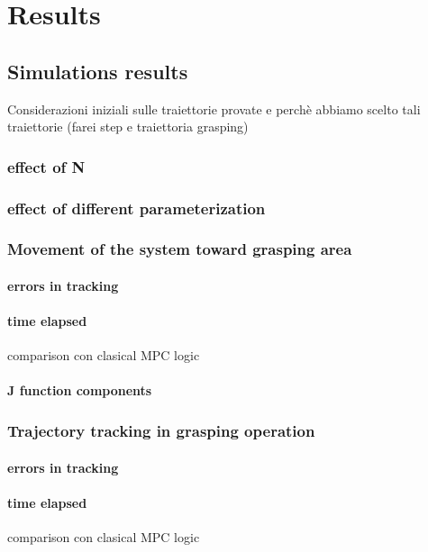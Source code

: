 
\chapter{Results}
\label{chapter7}

\section{Simulations results}
Considerazioni iniziali sulle traiettorie provate e perchè abbiamo scelto tali traiettorie (farei step e traiettoria grasping)
	\subsection{effect of N}
		
	\subsection{effect of different parameterization}
		
	\subsection{Movement of the system toward grasping area}

		\subsubsection{errors in tracking}
			
		\subsubsection{time elapsed}
			comparison con clasical MPC logic
		\subsubsection{J function components}

	\subsection{Trajectory tracking in grasping operation}

		\subsubsection{errors in tracking}
			
		\subsubsection{time elapsed}
			comparison con clasical MPC logic
